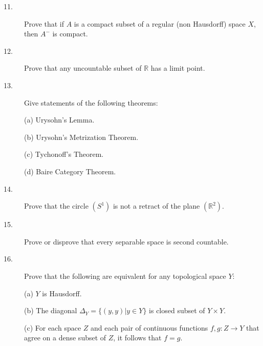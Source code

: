 \documentclass{article}
\def\R{\mathbb R}
\begin{document}
\begin{description}
\item[11.]
Prove that if $A$ is a compact subset of a regular (non Hausdorff) space
$X$, then $A^-$ is compact.

\item[12.]
Prove that any uncountable subset of $\R$ has a limit point.

\item[13.]
Give statements of the following theorems:

\item[\quad] (a)
Urysohn's Lemma.

\item[\quad] (b)
Urysohn's Metrization Theorem.

\item[\quad] (c)
Tychonoff's Theorem.

\item[\quad] (d)
Baire Category Theorem.

\item[14.]
Prove that the circle $(S^1)$ is not a retract of the plane $(\R^2)$.

\item[15.]
Prove or disprove that every separable space is second countable.

\item[16.]
Prove that the following are equivalent for any topological space $Y$:

\item[\quad] (a)
$Y$ is Hausdorff.

\item[\quad] (b)
The diagonal $\Delta_Y = \{(y,y) |y \in Y\}$ is closed subset of $Y \times Y$.

\item[\quad] (c)
For each space $Z$ and each pair of continuous functions $f,g: Z \to Y$
that agree on a dense subset of $Z$, it follows that $f = g$.





\end{description}    
\end{document}
